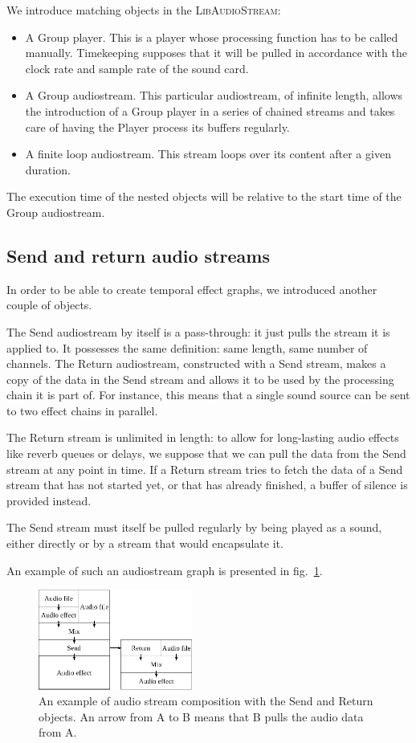 \documentclass{article}
\newcommand*{\LibAudioStream}{\textsc{LibAudioStream}\xspace}
\begin{document}
We introduce matching objects in the \LibAudioStream: 
\begin{itemize}
	\item A Group player. This is a player whose processing function has to be called manually. 
	Timekeeping supposes that it will be pulled in accordance with the clock rate
	and sample rate of the sound card.
	\item A Group audiostream. This particular audiostream, of infinite length, 
	allows the introduction of a Group player in a series of chained streams and takes care of having the Player process its buffers
    regularly.
    \item A finite loop audiostream.
    This stream loops over its content after a given duration.
\end{itemize}

The execution time of the nested objects will be relative to the start time of the Group audiostream.

\subsection{Send and return audio streams}
In order to be able to create temporal effect graphs, we introduced another couple of objects.

The Send audiostream by itself is a pass-through: it just pulls the stream it is applied to.
It possesses the same definition: same length, same number of channels.
The Return audiostream, constructed with a Send stream, makes a copy of the data in 
the Send stream and allows it to be used by the processing chain it is part of.
For instance, this means that a single sound source can be sent to two effect chains in parallel.

The Return stream is unlimited in length: to allow for long-lasting audio effects 
like reverb queues or delays, we suppose that we can pull the data from the Send stream at any point in time.
If a Return stream tries to fetch the data of a Send stream that has not started yet, or that has already finished, a buffer of silence is provided instead.

The Send stream must itself be pulled regularly by being played as a sound, either directly or by a stream that would encapsulate it.

An example of such an audiostream graph is presented in fig.~\ref{fig.mixsendreturn}.

\begin{figure}[h]
	\centering
	\includegraphics[width=0.45\textwidth]{figures/graph2.eps}
	\caption{An example of audio stream composition with the Send and Return objects. An arrow from A to B means that B pulls the audio data from A.}
	\label{fig.mixsendreturn}
\end{figure}
\end{document}
